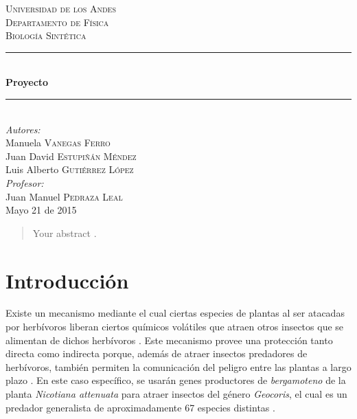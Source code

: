 \documentclass[12pt]{article}
\begin{document}
\begin{titlepage}

\newcommand{\HRule}{\rule{\linewidth}{0.5mm}}

\center

\textsc{\LARGE Universidad de los Andes}\\[1.5cm]
\textsc{\Large Departamento de F\'isica}\\[0.5cm]
\textsc{\large Biolog\'ia Sint\'etica}\\[0.5cm] 

\HRule \\[0.4cm]
{ \huge \bfseries {} Proyecto}\\[0.4cm]
\HRule \\[1.5cm]
 

\Large \emph{Autores:}\\
Manuela \textsc{Vanegas Ferro}\\
Juan David \textsc{Estupi\~n\'an M\'endez}\\
Luis Alberto \textsc{Guti\'errez L\'opez}\\[2cm]

\Large \emph{Profesor:}\\
Juan Manuel \textsc{Pedraza Leal}\\[3cm]


{\large Mayo 21 de 2015}\\[2cm]

\vfill

\end{titlepage}

\tableofcontents
\pagebreak

\begin{abstract}
  Your abstract \cite{cleland67}  \cite{harada09a} \cite{engerberg-kulka04}.
\end{abstract}

\section{Introducci\'on}

Existe un mecanismo mediante el cual ciertas especies de plantas al ser atacadas por herbívoros liberan ciertos químicos volátiles que atraen otros insectos que se alimentan de dichos herbívoros \cite{kressler01} \cite{taiz10} \cite{takabayashi96} \cite{turlings95} . Este mecanismo provee una protección tanto directa como indirecta porque, además de atraer insectos predadores de herb\'ivoros, también permiten la comunicación del peligro entre las plantas a largo plazo \cite{kressler01} \cite{taiz10}. En este caso específico, se usarán genes productores de \emph{bergamoteno} de la planta \emph{Nicotiana attenuata}  para atraer insectos del género \emph{Geocoris}, el cual es un predador generalista de aproximadamente 67 especies distintas \cite{crocker80}.\\
\end{document}
